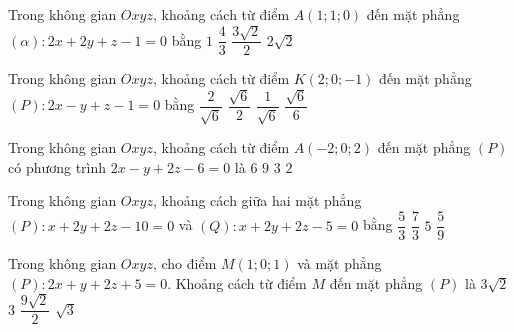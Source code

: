\begin{ex}%
	Trong không gian $Oxyz$, khoảng cách  từ điểm $A(1;1;0)$ đến mặt phẳng $(\alpha) \colon 2x+2y+z-1=0$ bằng
	\choice 
		{\True $1$} 
		 {$\dfrac{4}{3}$}
		{$\dfrac{3\sqrt{2}}{2}$} 
		 {$2\sqrt{2}$}
\end{ex}

\begin{ex}%
	Trong không gian $Oxyz$, khoảng cách từ  điểm $K(2; 0;-1)$ đến mặt phẳng $(P)\colon 2 x-y+z-1=0$ bằng
	 \choice
		{\True  $\dfrac{2}{\sqrt{6}}$}
		{$\dfrac{\sqrt{6}}{2}$} 
		 {$\dfrac{1}{\sqrt{6}}$}
		{$\dfrac{\sqrt{6}}{6}$} 
\end{ex}

\begin{ex}%
	Trong không gian $Oxyz$, khoảng cách từ điểm $A(-2;0;2)$ đến mặt phẳng $(P)$ có phương trình $2x - y + 2z - 6 = 0$ là 
	\choice 
		 {$6$}
		{$9$} 
		{$3$} 
		{\True  $2$}
\end{ex}

\begin{ex}%
	Trong  không gian $Oxyz$, khoảng cách giữa hai mặt phẳng $(P)\colon x+2y+2z-10=0$ và $(Q)\colon x+2y+2z-5=0$ bằng
	\choice 
		{\True  $\dfrac{5}{3}$}
		 {$\dfrac{7}{3}$}
		{$5$} 
		{$\dfrac{5}{9}$} 
\end{ex}

\begin{ex}%
	Trong không gian $Oxyz$, cho điểm $M(1;0;1)$ và mặt phẳng $(P)\colon 2x+y+2z+5=0$. Khoảng cách từ điểm $M$ đến mặt phẳng  $(P)$ là
	 \choice
		 {$3\sqrt{2}$}
		{\True $3$} 
		{$\dfrac{9\sqrt{2}}{2}$} 
		 {$\sqrt{3}$}
\end{ex}


